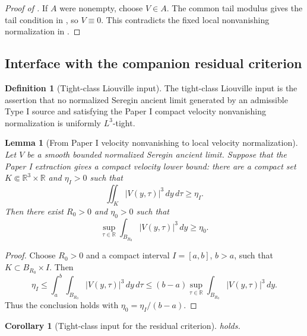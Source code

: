 \documentclass[11pt]{amsart}
\theoremstyle{plain}
\newtheorem{lemma}[theorem]{Lemma}
\newtheorem{corollary}[theorem]{Corollary}
\theoremstyle{definition}
\newtheorem{definition}[theorem]{Definition}
\theoremstyle{remark}
\numberwithin{equation}{section}
\newcommand{\R}{\mathbb R}
\begin{document}
\begin{proof}[Proof of ]
If \(A\) were nonempty, choose \(V\in A\).  The common tail modulus gives the
tail condition in , so \(V\equiv0\).  This contradicts
the fixed local nonvanishing normalization in .
\end{proof}

\subsection{Interface with the companion residual criterion}

\begin{definition}[Tight-class Liouville input]
\label{def:tight-class-input}
The tight-class Liouville input is the assertion that no normalized Seregin
ancient limit generated by an admissible Type I source and satisfying the
Paper I compact velocity nonvanishing normalization is uniformly \(L^3\)-tight.
\end{definition}

\begin{lemma}[From Paper I velocity nonvanishing to local velocity normalization]
\label{lem:seregin-to-velocity-nonzero}
Let \(V\) be a smooth bounded normalized Seregin ancient limit.  Suppose that
the Paper I extraction gives a compact velocity lower bound: there are a
compact set \(K\Subset\mathbb R^3\times\mathbb R\) and \(\eta_I>0\) such that
\[
   \iint_K |V(y,\tau)|^3\,dy\,d\tau\ge\eta_I .
\]
Then there exist \(R_0>0\) and \(\eta_0>0\) such that
\[
   \sup_{\tau\in\R}\int_{B_{R_0}}|V(y,\tau)|^3\,dy\ge\eta_0 .
\]
\end{lemma}

\begin{proof}
Choose \(R_0>0\) and a compact interval \(I=[a,b]\), \(b>a\), such that
\(K\subset B_{R_0}\times I\).  Then
\[
   \eta_I
   \le \int_a^b\int_{B_{R_0}}|V(y,\tau)|^3\,dy\,d\tau
   \le (b-a)\sup_{\tau\in\R}
          \int_{B_{R_0}}|V(y,\tau)|^3\,dy .
\]
Thus the conclusion holds with \(\eta_0=\eta_I/(b-a)\).
\end{proof}

\begin{corollary}[Tight-class input for the residual criterion]
\label{cor:tight-input-for-paper-I}
 holds.
\end{corollary}
\end{document}
